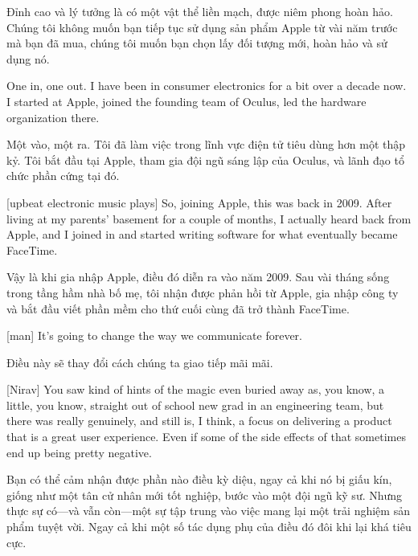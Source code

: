 \documentclass[a4paper]{article}
\begin{document}
	\begin{vietnamese-v2}
		Đỉnh cao và lý tưởng là có một vật thể liền mạch, được niêm phong hoàn hảo. 
		Chúng tôi không muốn bạn tiếp tục sử dụng sản phẩm Apple từ vài năm trước mà bạn đã mua, chúng tôi muốn bạn chọn lấy đối tượng mới, hoàn hảo và sử dụng nó.
	\end{vietnamese-v2}

	One in, one out.
	I have been in consumer electronics for a bit over a decade now.
	I started at Apple, joined the founding team of Oculus, led the hardware organization there.
	
	\begin{vietnamese-v2}
		Một vào, một ra. 
		Tôi đã làm việc trong lĩnh vực điện tử tiêu dùng hơn một thập kỷ. 
		Tôi bắt đầu tại Apple, tham gia đội ngũ sáng lập của Oculus, và lãnh đạo tổ chức phần cứng tại đó.
	\end{vietnamese-v2}
	
	
	[upbeat electronic music plays]
	So, joining Apple, this was back in 2009.
	After living at my parents' basement for a couple of months, I actually heard back from Apple, and I joined in and started writing software for what eventually became FaceTime.
	
	\begin{vietnamese-v2}
		Vậy là khi gia nhập Apple, điều đó diễn ra vào năm 2009. 
		Sau vài tháng sống trong tầng hầm nhà bố mẹ, tôi nhận được phản hồi từ Apple, gia nhập công ty và bắt đầu viết phần mềm cho thứ cuối cùng đã trở thành FaceTime.
	\end{vietnamese-v2}
	
	[man] It's going to change the way we communicate forever.
	
	\begin{vietnamese-v2}
		 Điều này sẽ thay đổi cách chúng ta giao tiếp mãi mãi.
	\end{vietnamese-v2}
	
	[Nirav] You saw kind of hints of the magic even buried away as, you know, a little, you know, straight out of school new grad in an engineering team, but there was really genuinely, and still is, I think, a focus on delivering a product that is a great user experience.
	Even if some of the side effects of that sometimes end up being pretty negative.
	
	\begin{vietnamese-v2}
		[Nirav] Bạn có thể cảm nhận được phần nào điều kỳ diệu, ngay cả khi nó bị giấu kín, giống như một tân cử nhân mới tốt nghiệp, bước vào một đội ngũ kỹ sư. Nhưng thực sự có—và vẫn còn—một sự tập trung vào việc mang lại một trải nghiệm sản phẩm tuyệt vời. Ngay cả khi một số tác dụng phụ của điều đó đôi khi lại khá tiêu cực.
	\end{vietnamese-v2}
	
\end{document}
